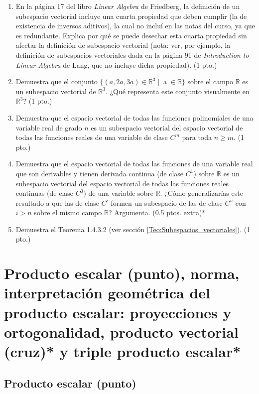 \documentclass[12pt]{article}
\begin{document}
\begin{enumerate}
    \item En la página 17 del libro \textit{Linear Algebra} de Friedberg, la definición de un subespacio vectorial incluye una cuarta propiedad que deben cumplir (la de existencia de inversos aditivos), la cual no incluí en las notas del curso, ya que es redundante. Explica por qué se puede desechar esta cuarta propiedad sin afectar la definición de subespacio vectorial (nota: ver, por ejemplo, la definición de subespacios vectoriales dada en la página 91 de \textit{Introduction to Linear Algebra} de Lang, que no incluye dicha propiedad). (1 pto.)
    \item Demuestra que el conjunto $\{(a,2a,3a)\in\mathbb{R}^3\mathop|\mathop a\in\mathbb{R}\}$ sobre el campo $\mathbb{R}$ es un subespacio vectorial de $\mathbb{R}^3$. ¿Qué representa este conjunto visualmente en $\mathbb{R}^3$? (1 pto.)
    \item Demuestra que el espacio vectorial de todas las funciones polinomiales de una variable real de grado $n$ es un subespacio vectorial del espacio vectorial de todas las funciones reales de una variable de clase $C^m$ para toda $n \geq m$. (1 pto.)
    \item Demuestra que el espacio vectorial de todas las funciones de una variable real que son derivables y tienen derivada continua (de clase $C^1$) sobre $\mathbb{R}$ es un subespacio vectorial del espacio vectorial de todas las funciones reales continuas (de clase $C^0$) de una variable sobre $\mathbb{R}$. ¿Cómo generalizarías este resultado a que las de clase $C^i$ formen un subespacio de las de clase $C^n$ con $i>n$ sobre el mismo campo $\mathbb{R}$? Argumenta. (0.5 ptos. extra)*
    \item Demuestra el Teorema 1.4.3.2 (ver sección \ref{Teo:Subespacios_vectoriales}). (1 pto.)
\end{enumerate}


\newpage
\section{Producto escalar (punto), norma, interpretación geométrica del producto escalar: proyecciones y ortogonalidad, producto vectorial (cruz)* y triple producto escalar*} \label{Sec:2}

\subsection{Producto escalar (punto)}
\end{document}
